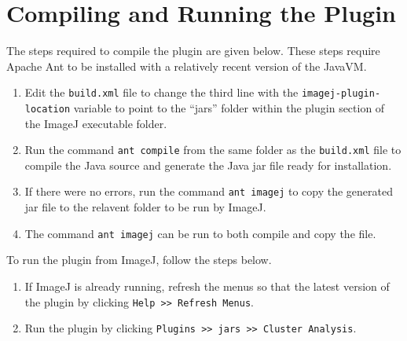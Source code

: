 
\section{Compiling and Running the Plugin}
\label{sec:running_the_plugin}

The steps required to compile the plugin are given below. These steps require
Apache Ant to be installed with a relatively recent version of the JavaVM\@.
\begin{enumerate}
	\item Edit the \texttt{build.xml} file to change the third line with the
		\texttt{imagej-plugin-location} variable to point to the ``jars''
		folder within the plugin section of the ImageJ executable folder.
	\item Run the command \texttt{ant compile} from the same folder as the
		\texttt{build.xml} file to compile the Java source and generate the
		Java jar file ready for installation.
	\item If there were no errors, run the command \texttt{ant imagej} to copy
		the generated jar file to the relavent folder to be run by ImageJ.
	\item The command \texttt{ant imagej} can be run to both compile and copy
		the file.
\end{enumerate}

To run the plugin from ImageJ, follow the steps below.
\begin{enumerate}
	\item If ImageJ is already running, refresh the menus so that the latest
		version of the plugin by clicking \texttt{Help >> Refresh Menus}.
	\item Run the plugin by clicking \texttt{Plugins >> jars >> Cluster
		Analysis}.
\end{enumerate}
